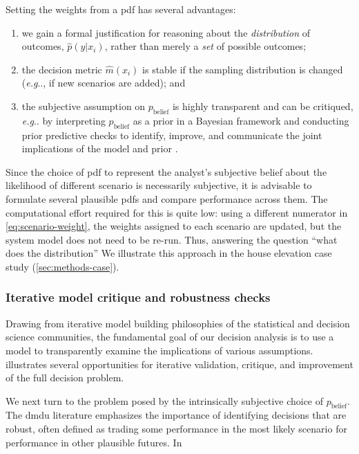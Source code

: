 \documentclass[12pt]{article}
\makeatletter
\DeclareRobustCommand\onedot{\futurelet\@let@token\@onedot}
\def\@onedot{\ifx\@let@token.\else.\null\fi\xspace}
\def\eg{\emph{e.g}\onedot} \def\Eg{\emph{E.g}\onedot}
\makeatother
\begin{document}
Setting the weights from a \gls{pdf} has several advantages:
\begin{enumerate}
    \item we gain a formal justification for reasoning about the \emph{distribution} of outcomes, $\hat{p}(y | x_i)$, rather than merely a \emph{set} of possible outcomes;
    \item the decision metric $\hat{m}(x_i)$ is stable if the sampling distribution is changed (\eg, if new scenarios are added); and
    \item the subjective assumption on $p_\text{belief}$ is highly transparent and can be critiqued, \eg by interpreting $p_\text{belief}$ as a prior in a Bayesian framework \citep{Gelman:2014tc,McElreath:2016vu} and conducting prior predictive checks to identify, improve, and communicate the joint implications of the model and prior \citep[see][section 2.4]{gelman_workflow:2020}.
\end{enumerate}
Since the choice of \gls{pdf} to represent the analyst's subjective belief about the likelihood of different scenario is necessarily subjective, it is advisable to formulate several plausible \glspl{pdf} and compare performance across them.
The computational effort required for this is quite low: using a different numerator in \cref{eq:scenario-weight}, the weights assigned to each scenario are updated, but the system model does not need to be re-run.
Thus, answering the question ``what does the distribution''
We illustrate this approach in the house elevation case study (\cref{sec:methods-case}).

\subsubsection{Iterative model critique and robustness checks}

Drawing from iterative model building philosophies of the statistical and decision science communities, the fundamental goal of our decision analysis is to use a model to transparently examine the implications of various assumptions.
 illustrates several opportunities for iterative validation, critique, and improvement of the full decision problem.



We next turn to the problem posed by the intrinsically subjective choice of $p_\text{belief}$.
The \gls{dmdu} literature emphasizes the importance of identifying decisions that are robust, often defined as trading some performance in the most likely scenario for performance in other plausible futures.
In
\end{document}
